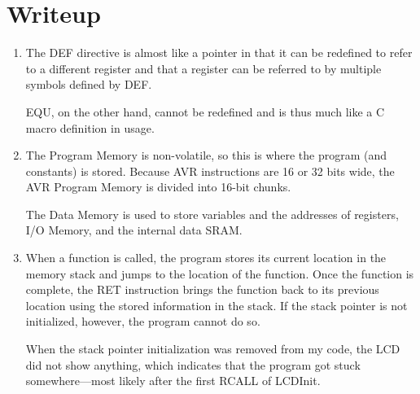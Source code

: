 \documentclass[12pt,letterpaper]{article}
\begin{document}
\section{Writeup}

\begin{enumerate}
	\item The DEF directive is almost like a pointer in that it can be
		redefined to refer to a different register and that a register can be
		referred to by multiple symbols defined by DEF.

		EQU, on the other hand, cannot be redefined and is thus much like
		a C macro definition in usage.

	\item The Program Memory is non-volatile, so this is where the program (and
		constants) is stored. Because AVR instructions are 16 or 32 bits wide,
		the AVR Program Memory is divided into 16-bit chunks.

		The Data Memory is used to store variables and the addresses of
		registers, I/O Memory, and the internal data SRAM.

	\item When a function is called, the program stores its current location in
		the memory stack and jumps to the location of the function. Once the
		function is complete, the RET instruction brings the function back to
		its previous location using the stored information in the stack. If the
		stack pointer is not initialized, however, the program cannot do so.
		
		When the stack pointer initialization was removed from my code, the LCD
		did not show anything, which indicates that the program got stuck
		somewhere---most likely after the first RCALL of LCDInit.
\end{enumerate}

\newpage

\end{document}
